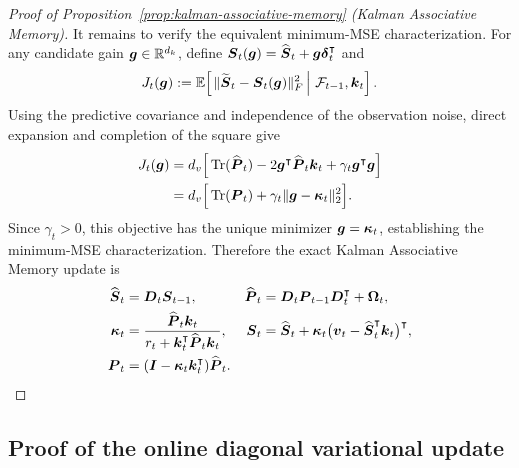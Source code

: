 \documentclass{article} %
\begin{document}
\begin{proof}[Proof of Proposition~\ref{prop:kalman-associative-memory} (Kalman Associative Memory)]
It remains to verify the equivalent minimum-MSE characterization. For any candidate gain
$\boldsymbol{g}\in\mathbb{R}^{d_k}$, define
$\boldsymbol{S}_t(\boldsymbol{g})=\widehat{\boldsymbol{S}}_t+\boldsymbol{g}\boldsymbol{\delta}_t^{\intercal}$ and
\begin{equation}
  J_t(\boldsymbol{g})
  :=\mathbb{E}\!\left[
    \left.
    \|\widetilde{\boldsymbol{S}}_t-\boldsymbol{S}_t(\boldsymbol{g})\|_F^2
    \,\right|\,\mathcal F_{t-1},\boldsymbol{k}_t
  \right].
  \label{eq:kam-mse-objective}
\end{equation}
Using the predictive covariance and independence of the observation noise, direct expansion and
completion of the square give
\begin{equation}
\begin{aligned}
  J_t(\boldsymbol{g})
  &=d_v\Big[
    \operatorname{Tr}(\widehat{\boldsymbol{P}}_t)
    -2\boldsymbol{g}^{\intercal}\widehat{\boldsymbol{P}}_t\boldsymbol{k}_t
    +\gamma_t\boldsymbol{g}^{\intercal}\boldsymbol{g}
  \Big] \\
  &=d_v\Big[
    \operatorname{Tr}(\boldsymbol{P}_t)
    +\gamma_t\|\boldsymbol{g}-\boldsymbol{\kappa}_t\|_2^2
  \Big].
\end{aligned}
  \label{eq:kam-mse-completed-square}
\end{equation}
Since $\gamma_t>0$, this objective has the unique minimizer
$\boldsymbol{g}=\boldsymbol{\kappa}_t$, establishing the minimum-MSE characterization.
Therefore the exact Kalman Associative Memory update is
\begin{equation}
\begin{aligned}
  \widehat{\boldsymbol{S}}_t
  &=\boldsymbol{D}_t\boldsymbol{S}_{t-1},
  &
  \widehat{\boldsymbol{P}}_t
  &=\boldsymbol{D}_t\boldsymbol{P}_{t-1}\boldsymbol{D}_t^{\intercal}+\boldsymbol{\Omega}_t,
  \\
  \boldsymbol{\kappa}_t
  &=
  \frac{\widehat{\boldsymbol{P}}_t\boldsymbol{k}_t}
  {r_t+\boldsymbol{k}_t^{\intercal}\widehat{\boldsymbol{P}}_t\boldsymbol{k}_t},
  &
  \boldsymbol{S}_t
  &=
  \widehat{\boldsymbol{S}}_t
  +
  \boldsymbol{\kappa}_t
  \big(\boldsymbol{v}_t-\widehat{\boldsymbol{S}}_t^{\intercal}\boldsymbol{k}_t\big)^{\intercal},
  \\
  \boldsymbol{P}_t
  &=
  (\boldsymbol{I}-\boldsymbol{\kappa}_t\boldsymbol{k}_t^{\intercal})\widehat{\boldsymbol{P}}_t.
\end{aligned}
\label{eq:kam-optimal-update}
\end{equation}
\end{proof}

\subsection{Proof of the online diagonal variational update}
\label{app:proof-diag-variational-inference}
\end{document}
